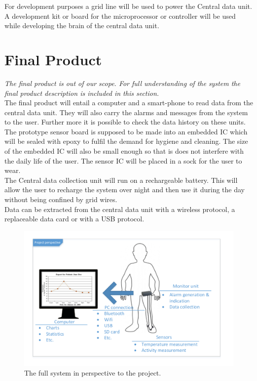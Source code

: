 For development purposes a grid line will be used to power the Central data unit. A development kit or board for the microprocessor or controller  will be used while developing the brain of the central data unit. \\

\section{Final Product}
\textit{The final product is out of our scope. For full understanding of the system the final product description is included in this section.}\\

The final product will entail a computer and a smart-phone to read data from the central data unit. They will also carry the alarms and messages from the system to the user. Further more it is possible to check the data history on these units. \\

The prototype sensor board is supposed to be made into an embedded IC which will be sealed with epoxy to fulfil the demand for hygiene and cleaning. The size of the embedded IC will also be small enough so that is does not interfere with the daily life of the user. The sensor IC will be placed in a sock for the user to wear. \\

The Central data collection unit will run on a rechargeable battery. This will allow the user to recharge the system over night and then use it during the day without being confined by grid wires.\\

Data can be extracted from the central data unit with a wireless protocol, a replaceable data card or with a USB protocol.
\begin{figure}[H]
\centering
\includegraphics[width=1\textwidth]{billeder/fullsystem_vector}
\caption{The full system in perspective to the project.}
\end{figure}
